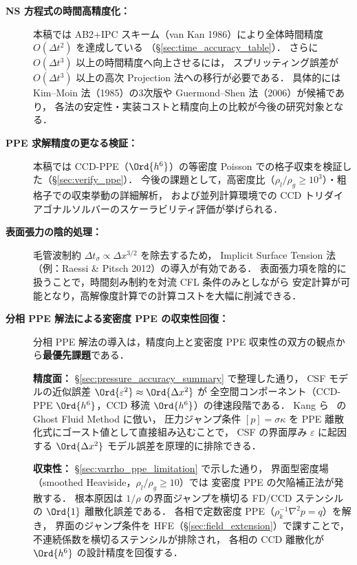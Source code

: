 \begin{description}
  \item[\textbf{NS 方程式の時間高精度化：}]
        本稿では AB2+IPC スキーム（van Kan 1986）により全体時間精度 $O(\Delta t^2)$ を達成している
        （§\ref{sec:time_accuracy_table}）．
        さらに $O(\Delta t^3)$ 以上の時間精度へ向上させるには，
        スプリッティング誤差が $O(\Delta t^3)$ 以上の高次 Projection 法への移行が必要である．
        具体的には Kim--Moin 法（1985）の3次版や Guermond--Shen 法（2006）が候補であり，
        各法の安定性・実装コストと精度向上の比較が今後の研究対象となる．

  \item[\textbf{PPE 求解精度の更なる検証：}]
        本稿では CCD-PPE（$\Ord{h^6}$）の等密度 Poisson での格子収束を検証した（§\ref{sec:verify_ppe}）．
        今後の課題として，高密度比（$\rho_l/\rho_g \geq 10^3$）・粗格子での収束挙動の詳細解析，
        および並列計算環境での CCD トリダイアゴナルソルバーのスケーラビリティ評価が挙げられる．

  \item[\textbf{表面張力の陰的処理：}]
        毛管波制約 $\Delta t_\sigma \propto \Delta x^{3/2}$ を除去するため，
        Implicit Surface Tension 法（例：Raessi \& Pitsch 2012）の導入が有効である．
        表面張力項を陰的に扱うことで，時間刻み制約を対流 CFL 条件のみとしながら
        安定計算が可能となり，高解像度計算での計算コストを大幅に削減できる．

  \item[\textbf{分相 PPE 解法による変密度 PPE の収束性回復：}]
        分相 PPE 解法の導入は，精度向上と変密度 PPE 収束性の双方の観点から\textbf{最優先課題}である．

        \textbf{精度面：}
        §\ref{sec:pressure_accuracy_summary} で整理した通り，
        CSF モデルの近似誤差 $\Ord{\varepsilon^2} \approx \Ord{\Delta x^2}$ が
        全空間コンポーネント（CCD-PPE $\Ord{h^6}$，CCD 移流 $\Ord{h^6}$）の律速段階である．
        Kang ら~\cite{Kang2000} の Ghost Fluid Method に倣い，
        圧力ジャンプ条件 $[p] = \sigma\kappa$ を PPE 離散化式にゴースト値として直接組み込むことで，
        CSF の界面厚み $\varepsilon$ に起因する $\Ord{\Delta x^2}$ モデル誤差を原理的に排除できる．

        \textbf{収束性：}
        §\ref{sec:varrho_ppe_limitation} で示した通り，
        界面型密度場（smoothed Heaviside，$\rho_l/\rho_g \geq 10$）では
        変密度 PPE の欠陥補正法が発散する．
        根本原因は $1/\rho$ の界面ジャンプを横切る FD/CCD ステンシルの $\Ord{1}$ 離散化誤差である．
        各相で定数密度 PPE（$\rho_k^{-1}\nabla^2 p = q$）を解き，
        界面のジャンプ条件を HFE（§\ref{sec:field_extension}）で課すことで，
        不連続係数を横切るステンシルが排除され，
        各相の CCD 離散化が $\Ord{h^6}$ の設計精度を回復する．


\end{description}
